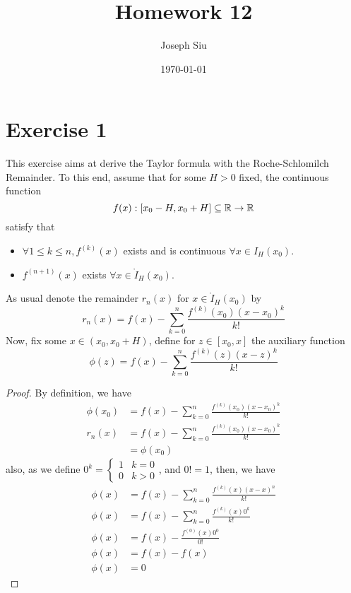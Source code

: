 \documentclass{homework}
\author{Joseph Siu}
\date{\today}
\title{Homework 12}
\newcommand{\R}{\bb{R}} %
\newcommand{\?}{\stackrel{?}{=}}
\theoremstyle{definition}
\begin{document}
 \maketitle

\section*{Exercise 1}
This exercise aims at derive the Taylor formula with the Roche-Schlomilch Remainder. To this end, assume that for some $H>0$ fixed, the continuous function \[f(x):[x_0-H,x_0+H]\subseteq\R\to\R\] satisfy that 
\begin{itemize}
    \item $\forall 1\leq k\leq n, f^{(k)}(x)$ exists and is continuous $\forall x\in I_H(x_0)$.
    \item $f^{(n+1)}(x)$ exists $\forall x\in \mathring{I}_H(x_0)$.
\end{itemize}
As usual denote the remainder $r_n(x)$ for $x\in\mathring{I}_H(x_0)$ by \[r_n(x)=f(x)-\sum_{k=0}^{n}\frac{f^{(k)}(x_0)(x-x_0)^k}{k!}\] Now, fix some $x\in(x_0,x_0+H)$, define for $z\in[x_0,x]$ the auxiliary function \[\phi(z)=f(x)-\sum_{k=0}^{n}\frac{f^{(k)}(z)(x-z)^k}{k!}\]


\begin{proof}
    By definition, we have
    \begin{align*}
        \phi(x_0)&=f(x)-\sum_{k=0}^{n}\frac{f^{(k)}(x_0)(x-x_0)^k}{k!}\\
        r_n(x)&=f(x)-\sum_{k=0}^{n}\frac{f^{(k)}(x_0)(x-x_0)^k}{k!}\\
        &=\phi(x_0)
    \end{align*}
    also, as we define $0^k=\begin{cases}
        1 & k=0\\
        0 & k>0
    \end{cases}$, and $0!=1$, then, we have
    \begin{align*}
        \phi(x)&=f(x)-\sum_{k=0}^{n}\frac{f^{(k)}(x)(x-x)^n}{k!}\\
        \phi(x)&=f(x)-\sum_{k=0}^{n}\frac{f^{(k)}(x)0^k}{k!}\\
        \phi(x)&=f(x)-\frac{f^{(0)}(x)0^0}{0!}\\
        \phi(x)&=f(x)-f(x)\\
        \phi(x)&=0
    \end{align*}
\end{proof}
\end{document}
